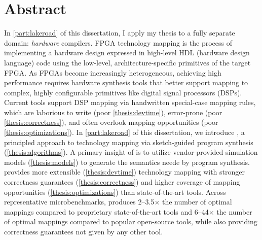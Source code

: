\chapter*{ Abstract}

In \cref{part:lakeroad} of this dissertation,
  I apply my thesis
  to a fully separate domain:
  \textit{hardware} compilers.
FPGA technology mapping is the process of
  implementing a hardware design expressed in 
  high-level HDL (hardware design language) code
  using the low-level, architecture-specific primitives of 
  the target FPGA.
As FPGAs become increasingly heterogeneous, 
  achieving high performance
  requires hardware synthesis tools 
  that better support mapping to complex, 
  highly configurable primitives 
  like digital signal processors (DSPs).
Current tools
  support DSP mapping via handwritten special-case mapping rules,
  which are laborious to write
  (poor \cref{thesis:devtime}),
  error-prone
  (poor \cref{thesis:correctness}),
  and often overlook mapping opportunities
  (poor \cref{thesis:optimizations}).
In \cref{part:lakeroad} of this dissertation,
  we introduce \lr,
  a principled approach to technology mapping via
  sketch-guided program synthesis
  (\cref{thesis:algorithms}).
A primary insight of \lr
  is to utilize vendor-provided
  simulation models
  (\cref{thesis:models})
  to generate the semantics
  neede by program synthesis.
\lr provides more
  extensible (\cref{thesis:devtime})
  technology mapping 
  with stronger correctness guarantees
  (\cref{thesis:correctness})
  and higher coverage of 
  mapping opportunities
  (\cref{thesis:optimizations})
  than state-of-the-art tools.
Across representative microbenchmarks,
  \lr produces
  2--3.5$\times$ the number of optimal mappings
  compared to proprietary state-of-the-art tools
  and
  6--44$\times$ the number of optimal mappings
  compared to popular open-source tools,
  while also providing correctness guarantees
  not given by any other tool.